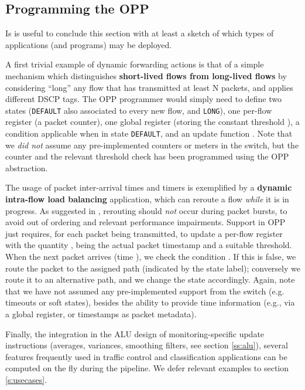 \documentclass{sig-alternate}
\begin{document}
\subsection{Programming the OPP}

Is is useful to conclude this section with at least a sketch of which types of applications (and programs) may be deployed. 

A first trivial example of dynamic forwarding actions is that of a simple mechanism which distinguishes {\bf short-lived flows from long-lived flows} by considering ``long'' any flow that has transmitted at least N packets, and applies different DSCP tags. The OPP programmer would simply need to define two states (\texttt{DEFAULT} also associated to every new flow, and \texttt{LONG}), one per-flow register  (a packet counter), one global register  (storing the constant threshold ), a condition  applicable when in state \texttt{DEFAULT}, and an update function . Note that we {\em did not} assume any pre-implemented counters or meters in the switch, but the counter and the relevant threshold check has been programmed using the OPP abstraction.

The usage of packet inter-arrival times and timers is exemplified by a {\bf dynamic intra-flow load balancing} application, which can reroute a flow {\em while} it is in progress. As suggested in \cite{Kan07}, rerouting should {\em not} occur during packet bursts, to avoid out of ordering and relevant performance impairments. Support in OPP just requires, for each packet being transmitted, to update a per-flow register  with the quantity , being  the actual packet timestamp and  a suitable threshold. When the next packet arrives (time ), we check the condition . If this is false, we route the packet to the assigned path (indicated by the state label); conversely we route it to an alternative path, and we change the state accordingly. Again, note that we have not assumed any pre-implemented support from the switch (e.g. timeouts or soft states), besides the ability to provide time information (e.g., via a global register, or timestamps as packet metadata).

Finally, the integration in the ALU design of monitoring-specific update instructions (averages, variances, smoothing filters, see section \ref{ss:alu}), several features frequently used in traffic control and classification applications can be computed on the fly during the pipeline. We defer relevant examples to section \ref{s:usecases}.
\end{document}
